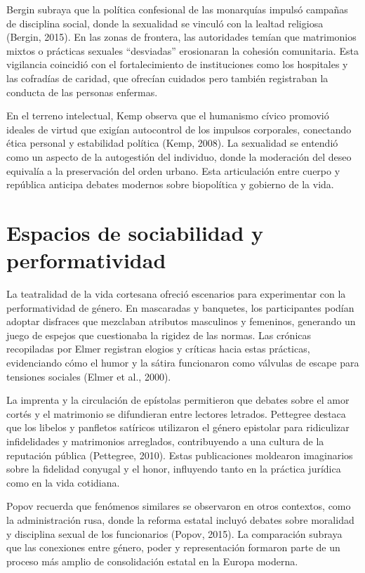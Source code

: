 Bergin subraya que la política confesional de las monarquías impulsó campañas de disciplina social, donde la sexualidad se vinculó con la lealtad religiosa (Bergin, 2015). En las zonas de frontera, las autoridades temían que matrimonios mixtos o prácticas sexuales “desviadas” erosionaran la cohesión comunitaria. Esta vigilancia coincidió con el fortalecimiento de instituciones como los hospitales y las cofradías de caridad, que ofrecían cuidados pero también registraban la conducta de las personas enfermas.

En el terreno intelectual, Kemp observa que el humanismo cívico promovió ideales de virtud que exigían autocontrol de los impulsos corporales, conectando ética personal y estabilidad política (Kemp, 2008). La sexualidad se entendió como un aspecto de la autogestión del individuo, donde la moderación del deseo equivalía a la preservación del orden urbano. Esta articulación entre cuerpo y república anticipa debates modernos sobre biopolítica y gobierno de la vida.

\section{Espacios de sociabilidad y performatividad}
La teatralidad de la vida cortesana ofreció escenarios para experimentar con la performatividad de género. En mascaradas y banquetes, los participantes podían adoptar disfraces que mezclaban atributos masculinos y femeninos, generando un juego de espejos que cuestionaba la rigidez de las normas. Las crónicas recopiladas por Elmer registran elogios y críticas hacia estas prácticas, evidenciando cómo el humor y la sátira funcionaron como válvulas de escape para tensiones sociales (Elmer et al., 2000).

La imprenta y la circulación de epístolas permitieron que debates sobre el amor cortés y el matrimonio se difundieran entre lectores letrados. Pettegree destaca que los libelos y panfletos satíricos utilizaron el género epistolar para ridiculizar infidelidades y matrimonios arreglados, contribuyendo a una cultura de la reputación pública (Pettegree, 2010). Estas publicaciones moldearon imaginarios sobre la fidelidad conyugal y el honor, influyendo tanto en la práctica jurídica como en la vida cotidiana.

Popov recuerda que fenómenos similares se observaron en otros contextos, como la administración rusa, donde la reforma estatal incluyó debates sobre moralidad y disciplina sexual de los funcionarios (Popov, 2015). La comparación subraya que las conexiones entre género, poder y representación formaron parte de un proceso más amplio de consolidación estatal en la Europa moderna.

